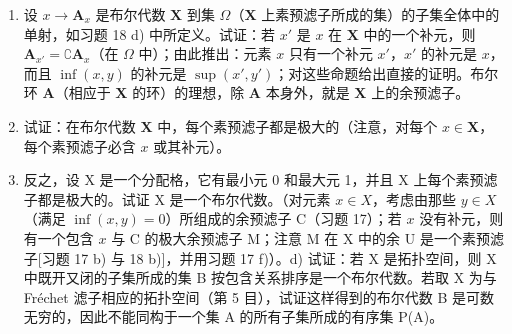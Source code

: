 \begin{enumerate}
\def\labelenumi{\alph{enumi})}
\item
  设 \(x \to \mathbf{A}_x\) 是布尔代数 \(\mathbf{X}\) 到集 \(\Omega\)（\(\mathbf{X}\) 上素预滤子所成的集）的子集全体中的单射，如习题 18 d) 中所定义。试证：若 \(x'\) 是 \(x\) 在 \(\mathbf{X}\) 中的一个补元，则 \(\mathbf{A}_{x'} = \complement \mathbf{A}_x\)（在 \(\Omega\) 中）；由此推出：元素 \(x\) 只有一个补元 \(x'\)，\(x'\) 的补元是 \(x\)，而且 \(\inf (x, y)\) 的补元是 \(\sup (x', y')\)；对这些命题给出直接的证明。布尔环 \(\mathbf{A}\)（相应于 \(\mathbf{X}\) 的环）的理想，除 \(\mathbf{A}\) 本身外，就是 \(\mathbf{X}\) 上的余预滤子。
\item
  试证：在布尔代数 \(\mathbf{X}\) 中，每个素预滤子都是极大的（注意，对每个 \(x \in \mathbf{X}\)，每个素预滤子必含 \(x\) 或其补元）。
\item
  反之，设 X 是一个分配格，它有最小元 0 和最大元 1，并且 X 上每个素预滤子都是极大的。试证 X 是一个布尔代数。（对元素 \(x \in X\)，考虑由那些 \(y \in X\)（满足 \(\inf(x, y) = 0\)）所组成的余预滤子 C（习题 17）；若 \(x\) 没有补元，则有一个包含 \(x\) 与 C 的极大余预滤子 M；注意 M 在 X 中的余 U 是一个素预滤子{[}习题 17 b) 与 18 b){]}，并用习题 17 f)）。d) 试证：若 X 是拓扑空间，则 X 中既开又闭的子集所成的集 B 按包含关系排序是一个布尔代数。若取 X 为与 Fréchet 滤子相应的拓扑空间（第 5 目），试证这样得到的布尔代数 B 是可数无穷的，因此不能同构于一个集 A 的所有子集所成的有序集 P(A)。
\end{enumerate}
